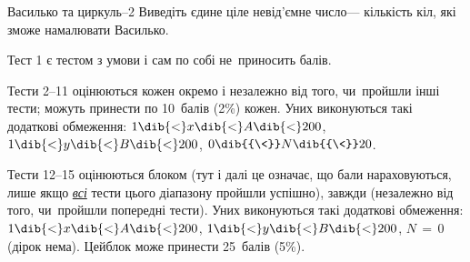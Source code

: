{\begin{problemAllDefault}{Василько та циркуль--2}
\OutputFile
Виведіть єдине ціле невід'ємне число\nolinebreak[3] --- кількість кіл, які зможе намалювати Василько.


\Example
\begin{exampleSimpleThree}{6em}{3em}{0.35\textwidth}{}
%
\end{exampleSimpleThree}

\Scoring
Тест 1 є тестом з умови і сам по собі не~приносить балів.

Тести 2--11 оцінюються кожен окремо і незалежно від того, чи~пройшли інші тести; можуть принести по 10~балів (2\%) кожен. 
У\nolinebreak[3] них виконуються такі додаткові обмеження: 
$1\dib{{<}}x\dib{{<}}A\dib{{<}}200$,\hspace{0.5em plus 0.5em}
$1\dib{{<}}y\dib{{<}}B\dib{{<}}200$,\hspace{0.5em plus 0.5em}
$0\dib{{\<}}N\dib{{\<}}20$.

Тести 12--15 оцінюються блоком (тут і далі це означає, що бали нараховуються, лише якщо \underline{\emph{всі}} тести цього діапазону пройшли успішно), завжди (незалежно від того, чи~пройшли попередні тести). 
У\nolinebreak[3] них виконуються такі додаткові обмеження: 
$1\dib{{<}}x\dib{{<}}A\dib{{<}}200$,\hspace{0.5em plus 0.5em}
$1\dib{{<}}y\dib{{<}}B\dib{{<}}200$,\hspace{0.5em plus 0.5em}
${N\,{=}\,0}$ (дірок нема).\linebreak[2]\hspace{0.5em plus 0.5em}
Цей\nolinebreak[3] блок може принести 25~балів (5\%).


\end{problemAllDefault}}
